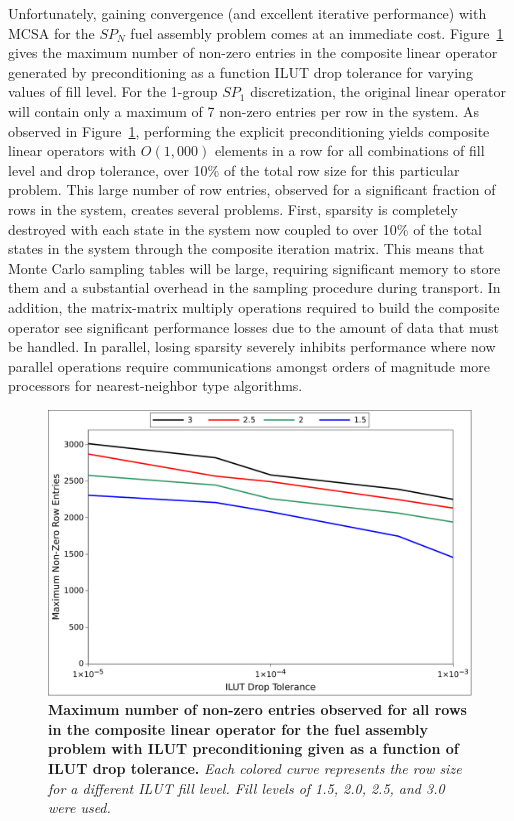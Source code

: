 Unfortunately, gaining convergence (and excellent iterative
performance) with MCSA for the $SP_N$ fuel assembly problem comes at
an immediate cost. Figure~\ref{fig:ilut_size} gives the maximum number
of non-zero entries in the composite linear operator generated by
preconditioning as a function ILUT drop tolerance for varying values
of fill level. For the 1-group $SP_1$ discretization, the original
linear operator will contain only a maximum of 7 non-zero entries per
row in the system. As observed in Figure~\ref{fig:ilut_size},
performing the explicit preconditioning yields composite linear
operators with $O(1,000)$ elements in a row for all combinations of
fill level and drop tolerance, over 10\% of the total row size for
this particular problem. This large number of row entries, observed
for a significant fraction of rows in the system, creates several
problems. First, sparsity is completely destroyed with each state in
the system now coupled to over 10\% of the total states in the system
through the composite iteration matrix. This means that Monte Carlo
sampling tables will be large, requiring significant memory to store
them and a substantial overhead in the sampling procedure during
transport. In addition, the matrix-matrix multiply operations required
to build the composite operator see significant performance losses due
to the amount of data that must be handled. In parallel, losing
sparsity severely inhibits performance where now parallel operations
require communications amongst orders of magnitude more processors for
nearest-neighbor type algorithms.
\begin{figure}[t!]
  \begin{center}
    \includegraphics[width=6in]{chapters/spn_equations/ilut_size.pdf}
  \end{center}
  \caption{\textbf{Maximum number of non-zero entries observed for all
      rows in the composite linear operator for the fuel assembly
      problem with ILUT preconditioning given as a function of ILUT
      drop tolerance.} \textit{Each colored curve represents the row
      size for a different ILUT fill level. Fill levels of 1.5, 2.0,
      2.5, and 3.0 were used.}}
  \label{fig:ilut_size}
\end{figure}

